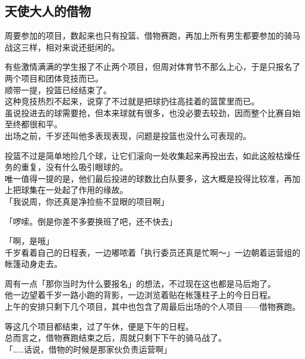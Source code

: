 \subsection{天使大人的借物}

周要参加的项目，数起来也只有投篮、借物赛跑，再加上所有男生都要参加的骑马战这三样，相对来说还挺闲的。

有些激情满满的学生报了不止两个项目，但周对体育节不那么上心，于是只报名了两个项目和团体竞技而已。\\

顺带一提，投篮已经结束了。\\

这种竞技热烈不起来，说穿了不过就是把球扔往高挂着的篮筐里而已。\\

虽说投进去的球需要抢，但本来球就有很多，也没必要去较劲，因而整个比赛自始至终都很和平。\\

出场之前，千岁还叫他多表现表现，问题是投篮也没什么可表现的。

投篮不过是简单地捡几个球，让它们滚向一处收集起来再投出去，如此这般枯燥任务的重复，没有什么吸引眼球的。\\

唯一值得一提的是，他们最后投进的球数比白队要多，这大概是投得比较准，再加上把球集在一处起了作用的缘故。\\

「我说周，你还真是净捡些不显眼的项目啊」

「啰嗦。倒是你差不多要换班了吧，还不快去」

「啊，是哦」\\

千岁看着自己的日程表，一边嘟哝着「执行委员还真是忙啊～」一边朝着运营组的帐篷动身走去。

周有一点「那你当时为什么要报名」的想法，不过现在这也都是马后炮了。\\

他一边望着千岁一路小跑的背影，一边浏览着贴在帐篷柱子上的今日日程。\\

上午的安排只剩下几个项目，其中也包含了周最后出场的个人项目——借物赛跑。

等这几个项目都结束，过了午休，便是下午的日程。\\

总而言之，借物赛跑结束之后，周就只剩下下午的骑马战了。\\

「……话说，借物的时候是那家伙负责运营啊」\\

